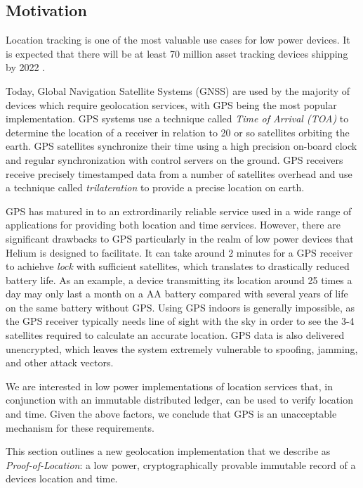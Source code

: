 \documentclass[UTF8, 10pt, nonatbib, nocopyrightspace, reprint]{sigplanconf}
\begin{document}
\subsection{Motivation}

Location tracking is one of the most valuable use cases for low power devices. It is expected that there will be at least 70 million asset tracking devices shipping by 2022 \cite{mobile-experts}.

Today, Global Navigation Satellite Systems (GNSS) are used by the majority of devices which require geolocation services, with GPS being the most popular implementation. GPS systems use a technique called \emph{Time of Arrival (TOA)} to determine the location of a receiver in relation to 20 or so satellites orbiting the earth. GPS satellites synchronize their time using a high precision on-board clock and regular synchronization with control servers on the ground. GPS receivers receive precisely timestamped data from a number of satellites overhead and use a technique called \emph{trilateration} to provide a precise location on earth.

GPS has matured in to an extrordinarily reliable service used in a wide range of applications for providing both location and time services. However, there are significant drawbacks to GPS particularly in the realm of low power devices that Helium is designed to facilitate. It can take around 2 minutes for a GPS receiver to achiehve \emph{lock} with sufficient satellites, which translates to drastically reduced battery life. As an example, a device transmitting its location around 25 times a day may only last a month on a AA battery compared with several years of life on the same battery without GPS. Using GPS indoors is generally impossible, as the GPS receiver typically needs line of sight with the sky in order to see the 3-4 satellites required to calculate an accurate location. GPS data is also delivered unencrypted, which leaves the system extremely vulnerable to spoofing, jamming, and other attack vectors.

We are interested in low power implementations of location services that, in conjunction with an immutable distributed ledger, can be used to verify location and time. Given the above factors, we conclude that GPS is an unacceptable mechanism for these requirements.

This section outlines a new geolocation implementation that we describe as \emph{Proof-of-Location}: a low power, cryptographically provable immutable record of a devices location and time.
\end{document}
